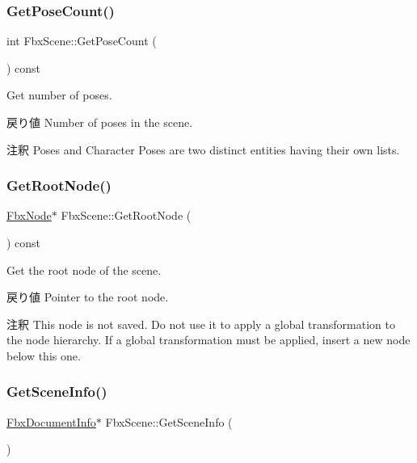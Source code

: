 \subsubsection{\texorpdfstring{Get\+Pose\+Count()}{GetPoseCount()}}
{\footnotesize\ttfamily int Fbx\+Scene\+::\+Get\+Pose\+Count (\begin{DoxyParamCaption}{ }\end{DoxyParamCaption}) const}

Get number of poses. \begin{DoxyReturn}{戻り値}
Number of poses in the scene. 
\end{DoxyReturn}
\begin{DoxyRemark}{注釈}
Poses and Character Poses are two distinct entities having their own lists. 
\end{DoxyRemark}
\mbox{\label{class_fbx_scene_ab27324d92595e85d18ec6749be79da09}} 
\subsubsection{\texorpdfstring{Get\+Root\+Node()}{GetRootNode()}}
{\footnotesize\ttfamily \hyperlink{class_fbx_node}{Fbx\+Node}$\ast$ Fbx\+Scene\+::\+Get\+Root\+Node (\begin{DoxyParamCaption}{ }\end{DoxyParamCaption}) const}

Get the root node of the scene. \begin{DoxyReturn}{戻り値}
Pointer to the root node. 
\end{DoxyReturn}
\begin{DoxyRemark}{注釈}
This node is not saved. Do not use it to apply a global transformation to the node hierarchy. If a global transformation must be applied, insert a new node below this one. 
\end{DoxyRemark}
\mbox{\label{class_fbx_scene_a5af52a77f2053fae74477261f857a0d8}} 
\subsubsection{\texorpdfstring{Get\+Scene\+Info()}{GetSceneInfo()}}
{\footnotesize\ttfamily \hyperlink{class_fbx_document_info}{Fbx\+Document\+Info}$\ast$ Fbx\+Scene\+::\+Get\+Scene\+Info (\begin{DoxyParamCaption}{ }\end{DoxyParamCaption})}

